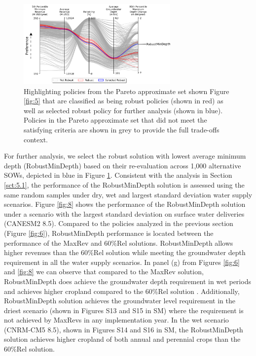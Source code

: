 \documentclass[a4paper,fleqn]{cas-sc}
\begin{document}
\begin{figure}[htp!]
    \includegraphics[width=0.7\textwidth,center]{./figs/selected_robust.png}
    \caption{Highlighting policies from the Pareto approximate set shown Figure \ref{fig:5} that are classified as being robust policies (shown in red) as well as selected robust policy for further analysis (shown in blue). Policies in the Pareto approximate set that did not meet the satisfying criteria are shown in grey to provide the full trade-offs context.} \label{fig:7}
\end{figure} 

For further analysis, we select the robust solution with lowest average minimum depth (RobustMinDepth) based on their re-evaluation across 1,000 alternative SOWs, depicted in blue in Figure \ref{fig:7}. Consistent with the analysis in Section \ref{sct:5.1}, the performance of the RobustMinDepth solution is assessed using the same random samples under dry, wet and largest standard deviation water supply scenarios. Figure \ref{fig:8} shows the performance of the RobustMinDepth solution under a scenario with the largest standard deviation on surface water deliveries (CANESM2 8.5). Compared to the policies analyzed in the previous section (Figure \ref{fig:6}), RobustMinDepth performance is located between the performance of the MaxRev and 60\%Rel solutions. RobustMinDepth allows higher revenues than the 60\%Rel solution while meeting the groundwater depth requirement in all the water supply scenarios. In panel (g) from Figures \ref{fig:6} and \ref{fig:8} we can observe that compared to the MaxRev solution, RobustMinDepth does achieve the groundwater depth requirement in wet periods and achieves higher cropland compared to the 60\%Rel solution . Additionally, RobustMinDepth solution achieves the groundwater level requirement in the driest scenario (shown in Figures S13 and S15 in SM) where the requirement is not achieved by MaxRevs in any implementation year. In the wet scenario (CNRM-CM5 8.5), shown in Figures S14 and S16 in SM, the RobustMinDepth solution achieves higher cropland of both annual and perennial crops than the 60\%Rel solution. 
\end{document}
